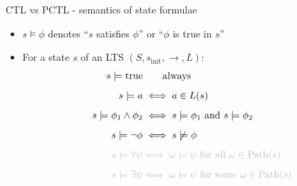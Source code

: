 \documentclass[dvipsnames]{beamer}
\begin{document}
\begin{frame}{CTL vs PCTL - semantics of state formulae}
    \begin{itemize}

        \item[] $s \models \phi$ denotes ``$s$ satisfies $\phi$'' or ``$\phi$ is true in $s$''

              \vspace{1em}

        \item[] For a state $s$ of an LTS $(S,s_{\text{init}},\rightarrow,L)$:
              \begin{align*}
                  s \models \text{true}
                   & \qquad \text{always}                                                                          \\[0.5em]
                  s \models a
                   & \iff a \in L(s)                                                                               \\[0.5em]
                  s \models \phi_1 \land \phi_2
                   & \iff s \models \phi_1 \text{ and } s \models \phi_2                                           \\[0.5em]
                  s \models \neg \phi
                   & \iff s \not\models \phi                                                                       \\[0.5em]
                  \textcolor{lightgray}{s \models \forall \psi}
                   & \textcolor{lightgray}{\iff \omega \models \psi \text{ for all } \omega \in \mathrm{Path}(s)}  \\[0.5em]
                  \textcolor{lightgray}{s \models \exists \psi}
                   & \textcolor{lightgray}{\iff \omega \models \psi \text{ for some } \omega \in \mathrm{Path}(s)}
              \end{align*}
    \end{itemize}
\end{frame}
\end{document}
